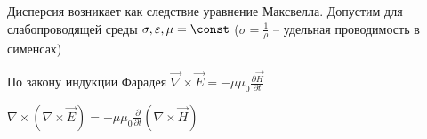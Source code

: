

Дисперсия возникает как следствие уравнение Максвелла. Допустим для слабопроводящей среды $\sigma, \varepsilon, \mu = \const$ ($\sigma = \frac{1}{\rho}$ -- удельная проводимость в сименсах)

По закону индукции Фарадея $\vec\nabla \times \vec E = -\mu\mu_0 \frac{\partial \vec H}{\partial t}$

$\nabla \times (\nabla \times \vec E) = -\mu\mu_0 \frac{\partial}{\partial t} (\nabla \times \vec H)$

